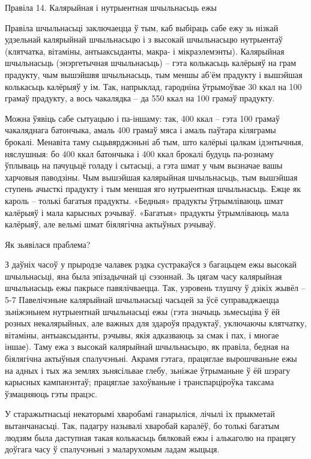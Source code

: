 Правіла 14. Калярыйная і нутрыентная шчыльнасьць ежы

Правіла шчыльнасьці заключаецца ў тым, каб выбіраць сабе ежу зь нізкай удзельнай калярыйнай шчыльнасьцю і з высокай шчыльнасьцю нутрыентаў (клятчатка, вітаміны, антыаксыданты, макра- і мікраэлемэнты). Калярыйная шчыльнасьць (энэргетычная шчыльнасьць) – гэта колькасьць калёрыяў на грам прадукту, чым вышэйшвя шчыльнасьць, тым меншы аб'ём прадукту і вышэйшая колькасьць калёрыяў у ім. Так, напрыклад, гародніна ўтрымоўвае 30 ккал на 100 грамаў прадукту, а вось чакалядка – да 550 ккал на 100 грамаў прадукту.

Можна ўявіць сабе сытуацыю і па-іншаму: так, 400 ккал – гэта 100 грамаў чакаляднага батончыка, амаль 400 грамаў мяса і амаль паўтара кіляграмы брокалі. Менавіта таму сьцьвярджэньні аб тым, што калёрыі цалкам ідэнтычныя, няслушныя: бо 400 ккал батончыка і 400 ккал брокалі будуць па-рознаму ўплываць на пачуцьцё голаду і сытасьці, а гэта шмат у чым вызначае вашы харчовыя паводзіны. Чым вышэйшая калярыйная шчыльнасьць, тым вышэйшая ступень ачысткі прадукту і тым меншая яго нутрыентная шчыльнасьць. Ежце як кароль – толькі багатыя прадукты. «Бедныя» прадукты ўтрымліваюць шмат калёрыяў і мала карысных рэчываў. «Багатыя» прадукты ўтрымліваюць мала калёрыяў, але вельмі шмат біялягічна актыўных рэчываў.

Як зьявілася праблема?

З даўніх часоў у прыродзе чалавек рэдка сустракаўся з багацьцем ежы высокай шчыльнасьці, яна была эпізадычнай ці сэзоннай. Зь цягам часу калярыйная шчыльнасьць ежы пакрысе павялічваецца. Так, узровень тлушчу ў дзікіх жывёл – 5-7%
Павелічэньне калярыйнай шчыльнасьці часьцей за ўсё суправаджаецца зьніжэньнем нутрыентнай шчыльнасьці ежы (гэта значыць зьмесьціва ў ёй розных некалярыйных, але важных для здароўя прадуктаў, уключаючы клятчатку, вітаміны, антыаксыданты, рэчывы, якія адказваюць за смак і пах, і многае іншае). Таму ежа з высокай калярыйнай шчыльнасьцю, як правіла, бедная на біялягічна актыўныя спалучэньні. Акрамя гэтага, працяглае вырошчваньне ежы на адных і тых жа землях зьнясільвае глебу, зьніжае ўтрыманьне ў ёй шэрагу карысных кампанэнтаў; працяглае захоўваньне і транспарціроўка таксама ўзмацняюць гэты працэс.

У старажытнасьці некаторымі хваробамі ганарыліся, лічылі іх прыкметай вытанчанасьці. Так, падагру называлі хваробай каралёў, бо толькі багатым людзям была даступная такая колькасьць бялковай ежы і алькаголю на працягу доўгага часу ў спалучэньні з маларухомым ладам жыцьця.

